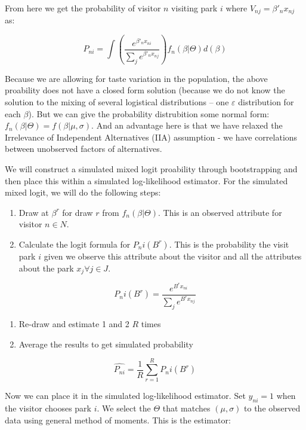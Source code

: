 \documentclass[
  letterpaper,
  DIV=11,
  numbers=noendperiod]{scrartcl}
\providecommand{\tightlist}{%
  \setlength{\itemsep}{0pt}\setlength{\parskip}{0pt}}\usepackage{longtable,booktabs,array}
\begin{document}
From here we get the probability of visitor \(n\) visiting park \(i\)
where \(V_{nj} = \beta'_n x_{nj}\) as:

\[
P_{ni} = \int \left( \frac{e^{\beta'_n x_{ni}}}{\sum_j e^{ \beta'_n x_{nj}}} \right) f_n(\beta|\Theta) d(\beta)
\]

Because we are allowing for taste variation in the population, the above
proability does not have a closed form solution (because we do not know
the solution to the mixing of several logistical distributions -- one
\(\varepsilon\) distribution for each \(\beta\)). But we can give the
probability distrubition some normal form:
\(f_n(\beta|\Theta) = f(\beta|\mu, \sigma)\). And an advantage here is
that we have relaxed the Irrelevance of Independent Alternatives (IIA)
assumption - we have correlations between unobserved factors of
alternatives.

We will construct a simulated mixed logit proability through
bootstrapping and then place this within a simulated log-likelihood
estimator. For the simulated mixed logit, we will do the following
steps:

\begin{enumerate}
\def\labelenumi{\arabic{enumi}.}
\tightlist
\item
  Draw at \(\beta^r\) for draw \(r\) from \(f_n(\beta|\Theta)\). This is
  an observed attribute for visitor \(n \in N\).
\item
  Calculate the logit formula for \(P_ni(B^r)\). This is the probability
  the visit park \(i\) given we observe this attribute about the visitor
  and all the attributes about the park \(x_j \forall j \in J\).
\end{enumerate}

\[
P_ni(B^r) = \frac{e^{B^r x_{ni}}}{\sum_j e^{B^r x_{nj}}}
\]

\begin{enumerate}
\def\labelenumi{\arabic{enumi}.}
\setcounter{enumi}{2}
\tightlist
\item
  Re-draw and estimate 1 and 2 \(R\) times
\item
  Average the results to get simulated probability
\end{enumerate}

\[
\hat{P_{ni}} = \frac{1}{R} \sum_{r=1}^R P_ni(B^r)
\]

Now we can place it in the simulated log-likelihood estimator. Set
\(y_{ni} = 1\) when the visitor chooses park \(i\). We select the
\(\Theta\) that matches \((\mu, \sigma)\) to the observed data using
general method of moments. This is the estimator:
\end{document}
